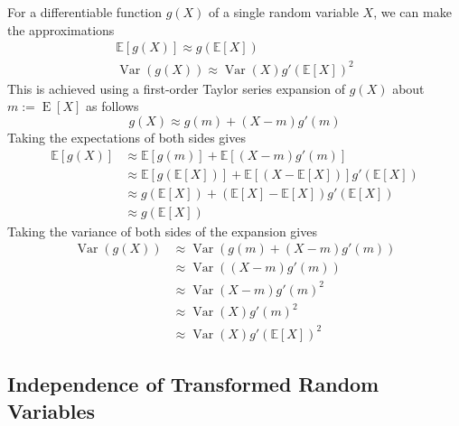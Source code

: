 \documentclass[11pt]{report} %
\begin{document}
For a differentiable function $g\left(X\right)$ of a single random variable $X$, we can make the approximations
\begin{gather}
\mathbb{E}\left[g\left(X\right)\right] \approx g\left(\mathbb{E}\left[X\right]\right) \\
\operatorname{Var}\left(g\left(X\right)\right) \approx \operatorname{Var}\left(X\right)g'\left(\mathbb{E}\left[X\right]\right)^{2}
\end{gather}
This is achieved using a first-order Taylor series expansion of $g\left(X\right)$ about $m := \operatorname{E}\left[X\right]$ as follows
\begin{equation}
g\left(X\right) \approx g\left(m\right) + \left(X - m\right)g'\left(m\right)
\end{equation}
Taking the expectations of both sides gives
\begin{align}
\mathbb{E}\left[g\left(X\right)\right] &\approx \mathbb{E}\left[g\left(m\right)\right] + \mathbb{E}\left[\left(X - m\right)g'\left(m\right)\right] \\
&\approx \mathbb{E}\left[g\left(\mathbb{E}\left[X\right]\right)\right] + \mathbb{E}\left[\left(X - \mathbb{E}\left[X\right]\right)\right]g'\left(\mathbb{E}\left[X\right]\right) \\
&\approx g\left(\mathbb{E}\left[X\right]\right) + \left(\mathbb{E}\left[X\right] - \mathbb{E}\left[X\right]\right)g'\left(\mathbb{E}\left[X\right]\right) \\
&\approx g\left(\mathbb{E}\left[X\right]\right)
\end{align}
Taking the variance of both sides of the expansion gives
\begin{align}
\operatorname{Var}\left(g\left(X\right)\right) &\approx \operatorname{Var}\left(g\left(m\right) + \left(X - m\right)g'\left(m\right)\right) \\
&\approx \operatorname{Var}\left(\left(X - m\right)g'\left(m\right)\right) \\
&\approx \operatorname{Var}\left(X - m\right)g'\left(m\right)^{2} \\
&\approx \operatorname{Var}\left(X\right)g'\left(m\right)^{2} \\
&\approx \operatorname{Var}\left(X\right)g'\left(\mathbb{E}\left[X\right]\right)^{2} 
\end{align}

\subsection{Independence of Transformed Random Variables}
\end{document}
